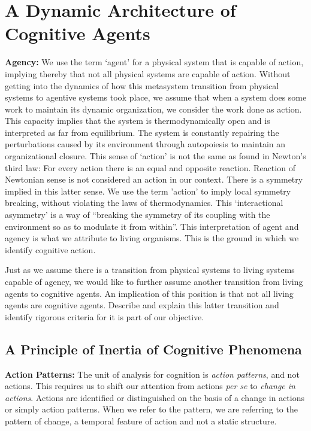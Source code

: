 \section{A Dynamic Architecture of Cognitive Agents}

\textbf{Agency: }We use the term `agent' for a physical system that is capable of action, implying thereby that not all physical systems are capable of action. Without getting into the dynamics of how this metasystem transition\cite{metasystem-francis} from physical systems to agentive systems took place, we assume that when a system does some work to maintain its dynamic organization, we consider the work done as action. This capacity implies that the system is thermodynamically open and is interpreted as far from equilibrium.\cite{prigogine2018order} The system is constantly repairing the perturbations caused by its environment through autopoiesis to maintain an organizational closure.\cite{maturana1991autopoiesis} This sense of `action' is not the same as found in Newton's third law: For every action there is an equal and opposite reaction. Reaction of Newtonian sense is not considered an action in our context.  There is a symmetry implied in this latter sense. We use the term 'action' to imply local symmetry breaking, without violating the laws of thermodynamics.  This `interactional asymmetry'  is a way of ``breaking the symmetry of its coupling with the environment so as to modulate it from within''.\cite{agency-defining} This interpretation of agent and agency is what we attribute to living organisms. This is the ground in which we identify cognitive action.  

Just as we assume there is a transition from physical systems to living systems capable of agency, we would like to further assume another transition from living agents to cognitive agents. An implication of this position is that not all living agents are cognitive agents. Describe and explain this latter transition and identify rigorous criteria for it is part of our objective.  



\subsection{A Principle of Inertia of Cognitive Phenomena}
\textbf{Action Patterns: }The unit of analysis for cognition is \textit{action patterns}, and not actions.  This requires us to shift our attention from actions \textit{per se} to \textit{change in actions}. Actions are identified or distinguished on the basis of a change in actions or simply action patterns. When we refer to the pattern, we are referring to the pattern of change, a temporal feature of action and not a static structure. 

